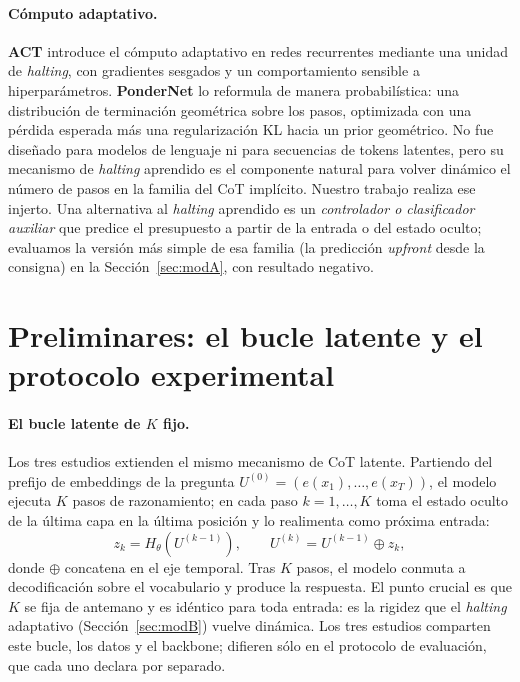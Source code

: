 \documentclass[11pt]{article}
\begin{document}
\paragraph{Cómputo adaptativo.} \textbf{ACT} \citep{graves2016act} introduce el cómputo adaptativo en redes recurrentes mediante una unidad de \textit{halting}, con gradientes sesgados y un comportamiento sensible a hiperparámetros. \textbf{PonderNet} \citep{banino2021pondernet} lo reformula de manera probabilística: una distribución de terminación geométrica sobre los pasos, optimizada con una pérdida esperada más una regularización KL hacia un prior geométrico. No fue diseñado para modelos de lenguaje ni para secuencias de tokens latentes, pero su mecanismo de \textit{halting} aprendido es el componente natural para volver dinámico el número de pasos en la familia del CoT implícito. Nuestro trabajo realiza ese injerto. Una alternativa al \textit{halting} aprendido es un \emph{controlador o clasificador auxiliar} que predice el presupuesto a partir de la entrada o del estado oculto; evaluamos la versión más simple de esa familia (la predicción \textit{upfront} desde la consigna) en la Sección~\ref{sec:modA}, con resultado negativo.

\section{Preliminares: el bucle latente y el protocolo experimental}
\label{sec:setup}

\paragraph{El bucle latente de $K$ fijo.} Los tres estudios extienden el mismo mecanismo de CoT latente. Partiendo del prefijo de embeddings de la pregunta $U^{(0)} = (e(x_1),\dots,e(x_T))$, el modelo ejecuta $K$ pasos de razonamiento; en cada paso $k = 1,\dots,K$ toma el estado oculto de la última capa en la última posición y lo realimenta como próxima entrada:
\begin{equation}
  z_k = H_\theta\!\left(U^{(k-1)}\right), \qquad
  U^{(k)} = U^{(k-1)} \oplus z_k,
  \label{eq:latentloop}
\end{equation}
donde $\oplus$ concatena en el eje temporal. Tras $K$ pasos, el modelo conmuta a decodificación sobre el vocabulario y produce la respuesta. El punto crucial es que $K$ se fija de antemano y es idéntico para toda entrada: es la rigidez que el \textit{halting} adaptativo (Sección~\ref{sec:modB}) vuelve dinámica. Los tres estudios comparten este bucle, los datos y el backbone; difieren sólo en el protocolo de evaluación, que cada uno declara por separado.
\end{document}
